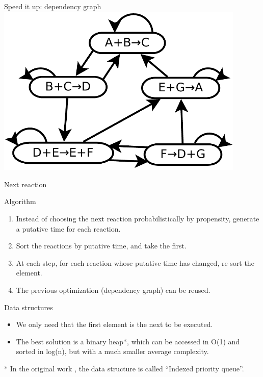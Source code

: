 \documentclass[presentation]{beamer}
\begin{document}
\begin{frame}{Speed it up: dependency graph}
  \centering
  \includegraphics[width=0.89\textwidth]{img/dependencygraph}
\end{frame}

\begin{frame}{Next reaction}
 \begin{block}{Algorithm}
  \begin{enumerate}
   \item Instead of choosing the next reaction probabilistically by propensity, generate a putative time for each reaction.
   \item Sort the reactions by putative time, and take the first.
   \item At each step, for each reaction whose putative time has changed, re-sort the element.
   \item The previous optimization (dependency graph) can be reused.
  \end{enumerate}
 \end{block}
 \begin{block}{Data structures}
  \begin{itemize}
   \item We only need that the first element is the next to be executed.
   \item The best solution is a binary heap*, which can be accessed in O(1) and sorted in log(n), but with a much smaller average complexity.
  \end{itemize}
 \end{block}
 * In the original work \cite{GibsonJPC1999}, the data structure is called ``Indexed priority queue''.
\end{frame}
\end{document}
